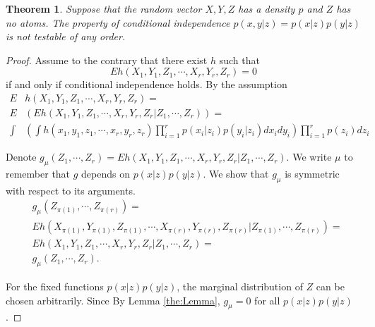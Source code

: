 \documentclass{article}
\newtheorem{Theorem}{Theorem}
\begin{document}
\begin{Theorem}
\label{th:1}
 Suppose that the random vector $X,Y,Z$ has a density $p$ and $Z$ has no atoms. The property of conditional independence $p(x,y|z) = p(x|z)p(y|z)$ is not testable of any order. 
\end{Theorem}

\begin{proof}
Assume to the contrary that there exist $h$ such that 
$$
E h(X_1,Y_1,Z_1, \cdots, X_r,Y_r,Z_r) =0 $$ 
if and only if conditional independence holds. By the assumption  
\begin{align}
 E& h(X_1,Y_1,Z_1, \cdots, X_r,Y_r,Z_r) = \\
 E& \left( E h(X_1,Y_1,Z_1, \cdots, X_r,Y_r,Z_r | Z_1,\cdots,Z_r) \right) = \\
 \int& \left(\int h(x_1,y_1,z_1,\cdots, x_r,y_r,z_r) \prod_{i=1}^r p(x_i|z_i)p(y_i|z_i) dx_i dy_i  \right)  \prod_{i=1}^r p(z_i)dz_i
\end{align}

Denote $g_{\mu}( Z_1,\cdots,Z_r) = E h(X_1,Y_1,Z_1, \cdots, X_r,Y_r,Z_r | Z_1,\cdots,Z_r)$. We write $\mu$ to remember that $g$ depends on $p(x|z)p(y|z)$. We show that $g_{\mu}$ is symmetric with respect to its arguments. 
\begin{align}
&g_{\mu}(Z_{\pi(1)}, \cdots,Z_{\pi(r)} )  = \\ 
&E h(X_{\pi(1)},Y_{\pi(1)},Z_{\pi(1)}, \cdots, X_{\pi(r)},Y_{\pi(r)},Z_{\pi(r)} | Z_{\pi(1)},\cdots,Z_{\pi(r)}) = \\
&E h(X_1,Y_1,Z_1, \cdots, X_r,Y_r,Z_r | Z_1,\cdots,Z_r) = \\
&g_{\mu}(Z_1, \cdots,Z_r ). 
\end{align}

For the fixed functions $p(x|z)p(y|z)$, the marginal distribution of $Z$ can be chosen  arbitrarily. Since  By Lemma \ref{the:Lemma}, $g_{\mu}=0$ for all $p(x|z)p(y|z)$.  


\end{proof}
\end{document}
